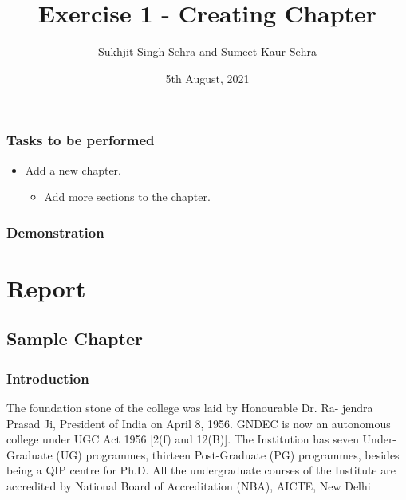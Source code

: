\documentclass[a4paper,12pt,twoside]{report}
\title{Exercise 1 - Creating Chapter}
\author{Sukhjit Singh Sehra and Sumeet Kaur Sehra}
\date{5th August, 2021}
\begin{document}
\maketitle	

\section*{Tasks to be performed}
\begin{itemize}	
\item Add a new chapter.
	\begin{itemize}
\item Add more sections to the chapter.
\end{itemize}
\end{itemize}
\section*{Demonstration}
\part{Report}
\chapter{Sample Chapter}
\section{Introduction}
The foundation stone of the college was laid by Honourable Dr. Ra-
jendra Prasad Ji, President of India on April 8, 1956. GNDEC is now an
autonomous college under UGC Act 1956 [2(f) and 12(B)]. The Institution
has seven Under-Graduate (UG) programmes, thirteen Post-Graduate (PG)
programmes, besides being a QIP centre for Ph.D. All the undergraduate
courses of the Institute are accredited by National Board of Accreditation
(NBA), AICTE, New Delhi
\end{document}
